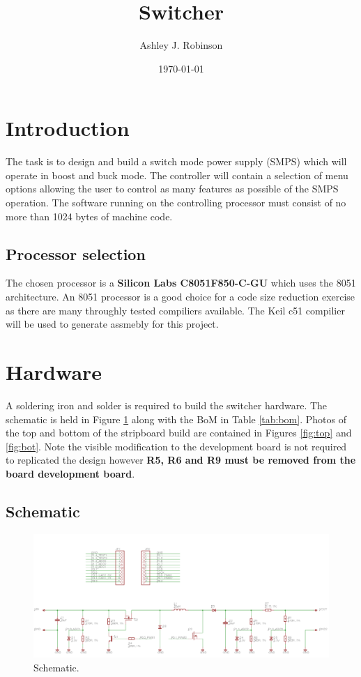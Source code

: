 \documentclass[12pt]{article}%
\begin{document}
\title{Switcher}
\author{Ashley J. Robinson}
\date{\today}
\maketitle
\section{Introduction}

The task is to design and build a switch mode power supply (SMPS) which will operate in boost and buck mode. The controller will contain a selection of menu options allowing the user to control as many features as possible of the SMPS operation. The software running on the controlling processor must consist of no more than 1024 bytes of machine code.

\subsection{Processor selection}

The chosen processor is a \textbf{Silicon Labs C8051F850-C-GU} which uses the 8051 architecture. An 8051 processor is a good choice for a code size reduction exercise as there are many throughly tested compiliers available. The Keil c51 compilier will be used to generate assmebly for this project.

\section{Hardware}

A soldering iron and solder is required to build the switcher hardware. The schematic is held in Figure \ref{fig:sch} along with the BoM in Table \ref{tab:bom}. Photos of the top and bottom of the stripboard build are contained in Figures \ref{fig:top} and \ref{fig:bot}. Note the visible modification to the development board is not required to replicated the design however \textbf{R5, R6 and R9 must be removed from the board development board}.

\subsection{Schematic}

\begin{figure}[H]
	\centering
  	\includegraphics[width=16cm]{sch.png}
  	\caption{Schematic.}
  	\label{fig:sch}
\end{figure}
\end{document}
